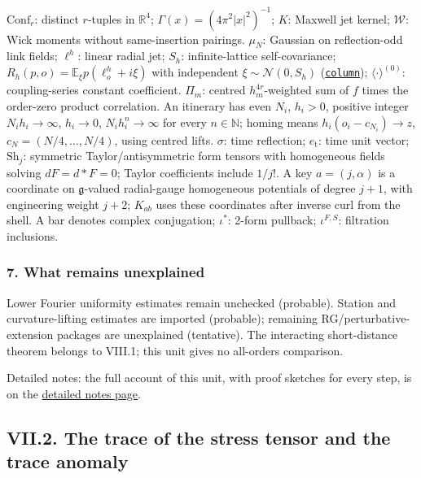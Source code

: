 \documentclass[
  letterpaper,
  11pt]{article}
\begin{document}
\(\mathrm{Conf}_r\): distinct \(r\)-tuples in \(\mathbb R^4\);
\(\Gamma(x)=(4\pi^2|x|^2)^{-1}\); \(K\): Maxwell jet kernel;
\(\mathcal W\): Wick moments without same-insertion pairings. \(\mu_N\):
Gaussian on reflection-odd link fields; \(\ell^h\): linear radial jet;
\(S_h\): infinite-lattice self-covariance;
\(R_h(p,o)=\mathbb E_\xi p(\ell_o^h+i\xi)\) with independent
\(\xi\sim\mathcal N(0,S_h)\)
(\href{https://github.com/yang-mills-group/OpenAI-YM-20261028/blob/3456e5e75cf8d4cd558955a5c7638fba2d68f464/YM/Pert/Lattice/Blank.lean\#L41}{\texttt{column}});
\(\langle\cdot\rangle^{(0)}\): coupling-series constant coefficient.
\(\Pi_m\): centred \(h_m^{4r}\)-weighted sum of \(f\) times the
order-zero product correlation. An itinerary has even \(N_i\),
\(h_i>0\), positive integer \(N_ih_i\to\infty\), \(h_i\to0\),
\(N_ih_i^n\to\infty\) for every \(n\in\mathbb N\); homing means
\(h_i(o_i-c_{N_i})\to z\), \(c_N=(N/4,\ldots,N/4)\), using centred
lifts. \(\sigma\): time reflection; \(e_{\mathrm t}\): time unit vector;
\(\mathrm{Sh}_j\): symmetric Taylor/antisymmetric form tensors with
homogeneous fields solving \(dF=d{*}F=0\); Taylor coefficients include
\(1/j!\). A key \(a=(j,\alpha)\) is a coordinate on
\(\mathfrak g\)-valued radial-gauge homogeneous potentials of degree
\(j+1\), with engineering weight \(j+2\); \(K_{ab}\) uses these
coordinates after inverse curl from the shell. A bar denotes complex
conjugation; \(\iota^*\): 2-form pullback; \(\iota^{F,S}\): filtration
inclusions.

\subsubsection{7. What remains
unexplained}\label{what-remains-unexplained-25}

Lower Fourier uniformity estimates remain unchecked (probable). Station
and curvature-lifting estimates are imported (probable); remaining
RG/perturbative-extension packages are unexplained (tentative). The
interacting short-distance theorem belongs to VIII.1; this unit gives no
all-orders comparison.

Detailed notes: the full account of this unit, with proof sketches for
every step, is on the
\href{https://github.com/scottnarmstrong/yang-mills-informalization/blob/main/outline/notes/VII-1.md}{detailed
notes page}.

\subsection{VII.2. The trace of the stress tensor and the trace
anomaly}\label{vii.2.-the-trace-of-the-stress-tensor-and-the-trace-anomaly}
\end{document}
